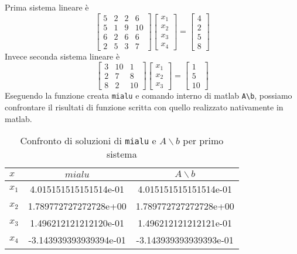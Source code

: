 Prima sistema lineare è
\[
   \begin{bmatrix}
      5 & 2 & 2 & 6  \\
      5 & 1 & 9 & 10 \\
      6 & 2 & 6 & 6  \\
      2 & 5 & 3 & 7
   \end{bmatrix}
   \begin{bmatrix}
      x_{1} \\
      x_{2} \\
      x_{3} \\
      x_{4}
   \end{bmatrix}
   =
   \begin{bmatrix}
      4 \\
      2 \\
      5 \\
      8
   \end{bmatrix}
\]
Invece seconda sistema lineare è
\[
   \begin{bmatrix}
      3 & 10 & 1  \\
      2 & 7  & 8  \\
      8 & 2  & 10
   \end{bmatrix}
   \begin{bmatrix}
      x_{1} \\
      x_{2} \\
      x_{3}
   \end{bmatrix}
   =
   \begin{bmatrix}
      1 \\
      5 \\
      10
   \end{bmatrix}
\]
Eseguendo la funzione creata \lstinline{mialu} e comando interno di
matlab \lstinline{A\b}, possiamo confrontare il risultati di funzione
scritta con quello realizzato nativamente in matlab.
\begin{table}[ht]
   \centering
   \renewcommand\arraystretch{2}
   \begin{tabular}{|l | c c |}
      \hline
      $x$     & $mialu$                & $A \backslash b$       \\
      \hline
      $x_{1}$ & 4.015151515151514e-01  & 4.015151515151514e-01  \\
      $x_{2}$ & 1.789772727272728e+00  & 1.789772727272728e+00  \\
      $x_{3}$ & 1.496212121212120e-01  & 1.496212121212121e-01  \\
      $x_{4}$ & -3.143939393939394e-01 & -3.143939393939393e-01 \\
      \hline
   \end{tabular}
   \caption{Confronto di soluzioni di \lstinline{mialu} e $A \backslash b$ per primo sistema}
   \label{tab:8_1}
\end{table}
